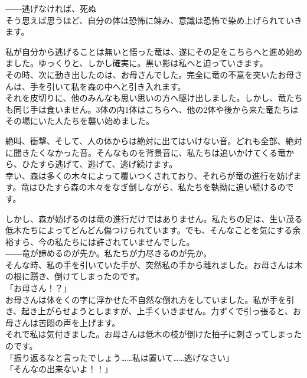 \documentclass[oneside, a4paper]{jsbook}
\begin{document}
――逃げなければ、死ぬ\\

そう思えば思うほど、自分の体は恐怖に竦み、意識は恐怖で染め上げられていきます。

私が自分から逃げることは無いと悟った竜は、遂にその足をこちらへと進め始めました。ゆっくりと、しかし確実に。黒い影は私へと迫っていきます。\\

その時、次に動き出したのは、お母さんでした。完全に竜の不意を突いたお母さんは、手を引いて私を森の中へと引き入れます。\\

それを皮切りに、他のみんなも思い思いの方へ駆け出しました。しかし、竜たちも同じ手は食いません。3体の内1体はこちらへ、他の2体や後から来た竜たちはその場にいた人たちを襲い始めました。

絶叫、衝撃、そして、人の体からは絶対に出てはいけない音。どれも全部、絶対に聞きたくなかった音。そんなものを背景音に、私たちは追いかけてくる竜から、ひたすら逃げて、逃げて、逃げ続けます。\\

幸い、森は多くの木々によって覆いつくされており、それらが竜の進行を妨げます。竜はひたすら森の木々をなぎ倒しながら、私たちを執拗に追い続けるのです。

しかし、森が妨げるのは竜の進行だけではありません。私たちの足は、生い茂る低木たちによってどんどん傷つけられています。でも、そんなことを気にする余裕すら、今の私たちには許されていませんでした。\\

――竜が諦めるのが先か。私たちが力尽きるのが先か。\\

そんな時、私の手を引いていた手が、突然私の手から離れました。お母さんは木の根に躓き、倒けてしまったのです。\\

「お母さん！？」\\

お母さんは体をくの字に浮かせた不自然な倒れ方をしていました。私が手を引き、起き上がらせようとしますが、上手くいきません。力ずくで引っ張ると、お母さんは苦悶の声を上げます。\\

それで私は気付きました。お母さんは低木の枝が倒けた拍子に刺さってしまったのです。\\

\noindent
「振り返るなと言ったでしょう……私は置いて……逃げなさい」\\
「そんなの出来ないよ！！」\\
\end{document}
